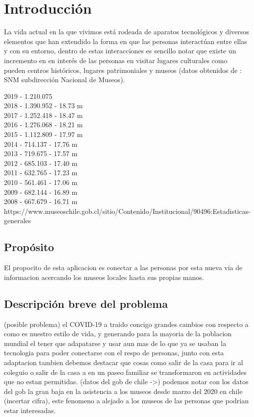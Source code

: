 \section{Introducción}
\color{red}
La vida actual en la que vivimos está rodeada de aparatos tecnológicos y diversos elementos que han extendido la forma en que las personas interactúan entre ellas y con su entorno, dentro de estas interacciones es sencillo notar que existe un incremento en en interés de las personas en visitar lugares culturales como pueden centros históricos, lugares patrimoniales y museos (datos obtenidos de : SNM subdirección Nacional de Museos).

2019 - 1.210.075\\
2018 - 1.390.952 - 18.73 m\\
2017 - 1.252.418 - 18.47 m\\
2016 - 1.276.068 - 18.21 m\\
2015 - 1.112.809 - 17.97 m\\
2014 - 714.137 - 17.76 m\\
2013 - 719.675 - 17.57 m\\
2012 - 685.103 - 17.40 m\\
2011 - 632.765 - 17.23 m\\
2010 - 561.461 - 17.06 m\\
2009 - 682.144 - 16.89 m\\
2008 - 667.679 - 16.71 m\\
https://www.museoschile.gob.cl/sitio/Contenido/Institucional/90496:Estadisticas-generales\\
\color{black}

\subsection{Propósito}
\color{red}
El propocito de esta aplicacion es conectar a las personas por esta nueva via de informacion acercando los museos locales hasta sus propias manos.
\color{black}

\subsection{Descripción breve del problema}
\color{red}
(posible problema) el COVID-19 a traido concigo grandes cambios con respecto a como es nuestro estilo de vida, y generando para la mayoria de la poblacion mundial el tener que adapatarse y usar aun mas de lo que ya se usaban la tecnologia para poder conectarse con el respo de personas,  junto con esta adaptacion tambien debemos destacar que cosas como salir de la casa para ir al coleguio o salir de la casa a en un paseo familiar se transformaron en actividades que no estan permitidas. (datos del gob de chile ->) podemos notar con los datos del gob la gran baja en la asistencia a los museos desde marzo del 2020 en chile (incertar cifra), este fenomeno a alejado a los museos de las personas que podrian estar interesadas.
\color{black}